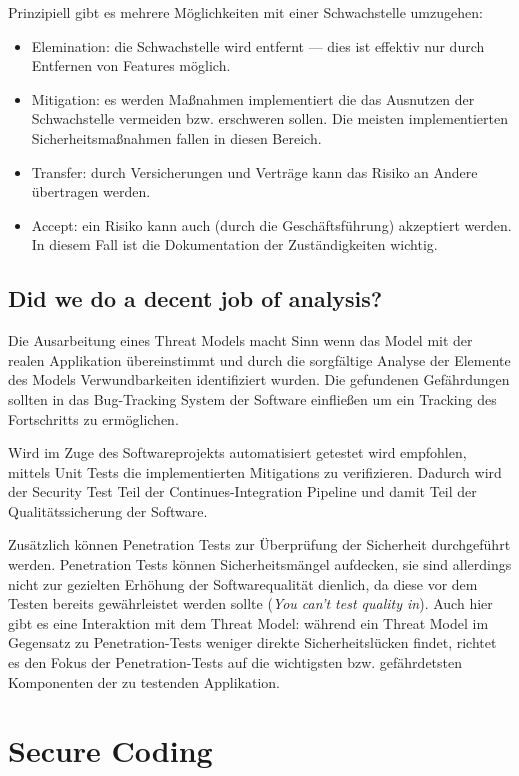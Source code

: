 Prinzipiell gibt es mehrere Möglichkeiten mit einer Schwachstelle umzugehen:

\begin{itemize}
	\item Elemination: die Schwachstelle wird entfernt --- dies ist effektiv nur durch Entfernen von Features möglich.
	\item Mitigation: es werden Maßnahmen implementiert die das Ausnutzen der Schwachstelle vermeiden bzw. erschweren sollen. Die meisten implementierten Sicherheitsmaßnahmen fallen in diesen Bereich.
	\item Transfer: durch Versicherungen und Verträge kann das Risiko an Andere übertragen werden.
	\item Accept: ein Risiko kann auch (durch die Geschäftsführung) akzeptiert werden. In diesem Fall ist die Dokumentation der Zuständigkeiten wichtig.
\end{itemize}

\subsection{Did we do a decent job of analysis?}

Die Ausarbeitung eines Threat Models macht Sinn wenn das Model mit der realen Applikation übereinstimmt und durch die sorgfältige Analyse der Elemente des Models Verwundbarkeiten identifiziert wurden. Die gefundenen Gefährdungen sollten in das Bug-Tracking System der Software einfließen um ein Tracking des Fortschritts zu ermöglichen.

Wird im Zuge des Softwareprojekts automatisiert getestet wird empfohlen, mittels Unit Tests die implementierten Mitigations zu verifizieren. Dadurch wird der Security Test Teil der Continues-Integration Pipeline und damit Teil der Qualitätssicherung der Software.

Zusätzlich können Penetration Tests zur Überprüfung der Sicherheit durchgeführt werden. Penetration Tests können Sicherheitsmängel aufdecken, sie sind allerdings nicht zur gezielten Erhöhung der Softwarequalität dienlich, da diese vor dem Testen bereits gewährleistet werden sollte (\textit{You can't test quality in}). Auch hier gibt es eine Interaktion mit dem Threat Model: während ein Threat Model im Gegensatz zu Penetration-Tests weniger direkte Sicherheitslücken findet, richtet es den Fokus der Penetration-Tests auf die wichtigsten bzw. gefährdetsten Komponenten der zu testenden Applikation.

\section{Secure Coding}

